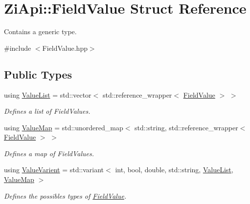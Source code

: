 \hypertarget{structZiApi_1_1FieldValue}{}\section{Zi\+Api\+::Field\+Value Struct Reference}
\label{structZiApi_1_1FieldValue}


Contains a generic type.  




{\ttfamily \#include $<$Field\+Value.\+hpp$>$}

\subsection*{Public Types}
\begin{DoxyCompactItemize}
\item 
\mbox{\label{structZiApi_1_1FieldValue_a9ab71bf0ac13af93bbf9f4d7018f0909}} 
using \mbox{\hyperlink{structZiApi_1_1FieldValue_a9ab71bf0ac13af93bbf9f4d7018f0909}{Value\+List}} = std\+::vector$<$ std\+::reference\+\_\+wrapper$<$ \mbox{\hyperlink{structZiApi_1_1FieldValue}{Field\+Value}} $>$ $>$
\begin{DoxyCompactList}\small\item\em Defines a list of Field\+Values. \end{DoxyCompactList}\item 
\mbox{\label{structZiApi_1_1FieldValue_a95c5ffaae9c08c1a6129847205258d8a}} 
using \mbox{\hyperlink{structZiApi_1_1FieldValue_a95c5ffaae9c08c1a6129847205258d8a}{Value\+Map}} = std\+::unordered\+\_\+map$<$ std\+::string, std\+::reference\+\_\+wrapper$<$ \mbox{\hyperlink{structZiApi_1_1FieldValue}{Field\+Value}} $>$ $>$
\begin{DoxyCompactList}\small\item\em Defines a map of Field\+Values. \end{DoxyCompactList}\item 
\mbox{\label{structZiApi_1_1FieldValue_ad15b3d7fad80efab396843e70a5b1db2}} 
using \mbox{\hyperlink{structZiApi_1_1FieldValue_ad15b3d7fad80efab396843e70a5b1db2}{Value\+Varient}} = std\+::variant$<$ int, bool, double, std\+::string, \mbox{\hyperlink{structZiApi_1_1FieldValue_a9ab71bf0ac13af93bbf9f4d7018f0909}{Value\+List}}, \mbox{\hyperlink{structZiApi_1_1FieldValue_a95c5ffaae9c08c1a6129847205258d8a}{Value\+Map}} $>$
\begin{DoxyCompactList}\small\item\em Defines the possibles types of \mbox{\hyperlink{structZiApi_1_1FieldValue}{Field\+Value}}. \end{DoxyCompactList}\end{DoxyCompactItemize}
